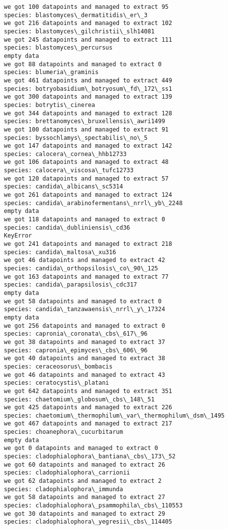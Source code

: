 \documentclass[11pt]{article}
\begin{document}
\begin{Verbatim}[commandchars=\\\{\}]
we got 100 datapoints and managed to extract 95
species: blastomyces\_dermatitidis\_er\_3
we got 216 datapoints and managed to extract 102
species: blastomyces\_gilchristii\_slh14081
we got 245 datapoints and managed to extract 111
species: blastomyces\_percursus
empty data
we got 88 datapoints and managed to extract 0
species: blumeria\_graminis
we got 461 datapoints and managed to extract 449
species: botryobasidium\_botryosum\_fd\_172\_ss1
we got 300 datapoints and managed to extract 139
species: botrytis\_cinerea
we got 344 datapoints and managed to extract 128
species: brettanomyces\_bruxellensis\_awri1499
we got 100 datapoints and managed to extract 91
species: byssochlamys\_spectabilis\_no\_5
we got 147 datapoints and managed to extract 142
species: calocera\_cornea\_hhb12733
we got 106 datapoints and managed to extract 48
species: calocera\_viscosa\_tufc12733
we got 120 datapoints and managed to extract 57
species: candida\_albicans\_sc5314
we got 261 datapoints and managed to extract 124
species: candida\_arabinofermentans\_nrrl\_yb\_2248
empty data
we got 118 datapoints and managed to extract 0
species: candida\_dubliniensis\_cd36
KeyError
we got 241 datapoints and managed to extract 218
species: candida\_maltosa\_xu316
we got 46 datapoints and managed to extract 42
species: candida\_orthopsilosis\_co\_90\_125
we got 163 datapoints and managed to extract 77
species: candida\_parapsilosis\_cdc317
empty data
we got 58 datapoints and managed to extract 0
species: candida\_tanzawaensis\_nrrl\_y\_17324
empty data
we got 256 datapoints and managed to extract 0
species: capronia\_coronata\_cbs\_617\_96
we got 38 datapoints and managed to extract 37
species: capronia\_epimyces\_cbs\_606\_96
we got 40 datapoints and managed to extract 38
species: ceraceosorus\_bombacis
we got 46 datapoints and managed to extract 43
species: ceratocystis\_platani
we got 642 datapoints and managed to extract 351
species: chaetomium\_globosum\_cbs\_148\_51
we got 425 datapoints and managed to extract 226
species: chaetomium\_thermophilum\_var\_thermophilum\_dsm\_1495
we got 467 datapoints and managed to extract 217
species: choanephora\_cucurbitarum
empty data
we got 0 datapoints and managed to extract 0
species: cladophialophora\_bantiana\_cbs\_173\_52
we got 60 datapoints and managed to extract 26
species: cladophialophora\_carrionii
we got 62 datapoints and managed to extract 2
species: cladophialophora\_immunda
we got 58 datapoints and managed to extract 27
species: cladophialophora\_psammophila\_cbs\_110553
we got 30 datapoints and managed to extract 29
species: cladophialophora\_yegresii\_cbs\_114405

\end{Verbatim}
\end{document}

